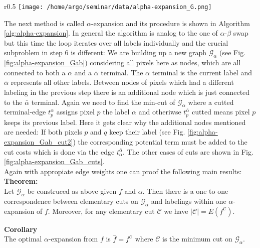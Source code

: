 \documentclass{scrartcl}[12pt, halfparskip]
\begin{document}
\begin{wrapfigure}{r}{0.5\textwidth}
	\vspace{-1.5cm}
	\texttt{[image: /home/argo/seminar/data/alpha-expansion\_G.png]}
	\caption{blubb}
	\label{fig:alpha-expansion_Gab}
\end{wrapfigure}

The next method is called $\alpha$-expansion and its procedure is shown in Algorithm \ref{alg:alpha-expansion}. In general the algorithm is analog to the one of $\alpha$-$\beta$ swap but this time the loop iterates over all labels individually and the crucial subproblem in step 6 is different:
We are building up a new graph $\mathcal{G}_\alpha$ (see Fig. \ref{fig:alpha-expansion_Gab}) considering all pixels here as nodes, which are all connected to both a $\alpha$ and a $\bar{\alpha}$ terminal. 
The $\alpha$ terminal is the current label and $\bar{\alpha}$ represents all other labels. 
Between nodes of pixels which had a different labeling in the previous step there is an additional node which is just connected to the $\bar{\alpha}$ terminal. 
Again we need to find the min-cut of $\mathcal{G}_\alpha$ where a cutted terminal-edge $t_p^\alpha$ assigns pixel $p$ the label $\alpha$ and otheriwse $t_p^{\bar{\alpha}}$ cutted means pixel $p$ keeps its previous label. Here it gets clear why the additional nodes mentioned are needed: If both pixels $p$ and $q$ keep their label (see Fig. \ref{fig:alpha-expansion_Gab_cut2}) the corresponding potential term must be added to the cut costs which is done via the edge $t_\alpha^{\bar{\alpha}}$. The other cases of cuts are shown in Fig. \ref{fig:alpha-expansion_Gab_cuts}. \\

Again with appropiate edge weights one can proof \cite{boykov01} the following main results: \\


\textbf{Theorem:} \\
Let $\mathcal{G}_\alpha$ be construced as above given $f$ and $\alpha$. Then there is a one to one correspondence between elementary cuts on $\mathcal{G}_\alpha$ and labelings within one $\alpha$-expansion of $f$. Moreover, for any elementary cut $\mathcal{C}$ we have $|\mathcal{C}| = E(f^\mathcal{C})$.

\textbf{Corollary} \\
The optimal $\alpha$-expansion from $f$ is $\hat{f} = f^\mathcal{C}$ where $\mathcal{C}$ is the minimum cut on $\mathcal{G}_\alpha$. \\
\end{document}
